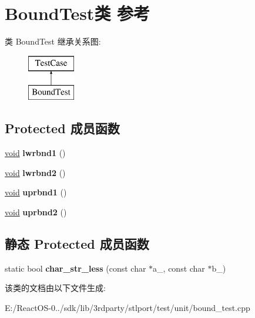 \hypertarget{class_bound_test}{}\section{Bound\+Test类 参考}
\label{class_bound_test}
类 Bound\+Test 继承关系图\+:\begin{figure}[H]
\begin{center}
\leavevmode
\includegraphics[height=2.000000cm]{class_bound_test}
\end{center}
\end{figure}
\subsection*{Protected 成员函数}
\begin{DoxyCompactItemize}
\item 
\mbox{\label{class_bound_test_a5cf0d904c2f6f0b54775f6378c74e063}} 
\hyperlink{interfacevoid}{void} {\bfseries lwrbnd1} ()
\item 
\mbox{\label{class_bound_test_a4166dbffbc4215f5a6de438055e4b966}} 
\hyperlink{interfacevoid}{void} {\bfseries lwrbnd2} ()
\item 
\mbox{\label{class_bound_test_a0cd52f1a8b6e9137d15ffb46c39e130d}} 
\hyperlink{interfacevoid}{void} {\bfseries uprbnd1} ()
\item 
\mbox{\label{class_bound_test_a55f265e94bf7f4cc204117da67678e0a}} 
\hyperlink{interfacevoid}{void} {\bfseries uprbnd2} ()
\end{DoxyCompactItemize}
\subsection*{静态 Protected 成员函数}
\begin{DoxyCompactItemize}
\item 
\mbox{\label{class_bound_test_a0449c0e11d87712626eaba701decd669}} 
static bool {\bfseries char\+\_\+str\+\_\+less} (const char $\ast$a\+\_\+, const char $\ast$b\+\_\+)
\end{DoxyCompactItemize}


该类的文档由以下文件生成\+:\begin{DoxyCompactItemize}
\item 
E\+:/\+React\+O\+S-\/0../sdk/lib/3rdparty/stlport/test/unit/bound\+\_\+test.\+cpp\end{DoxyCompactItemize}
